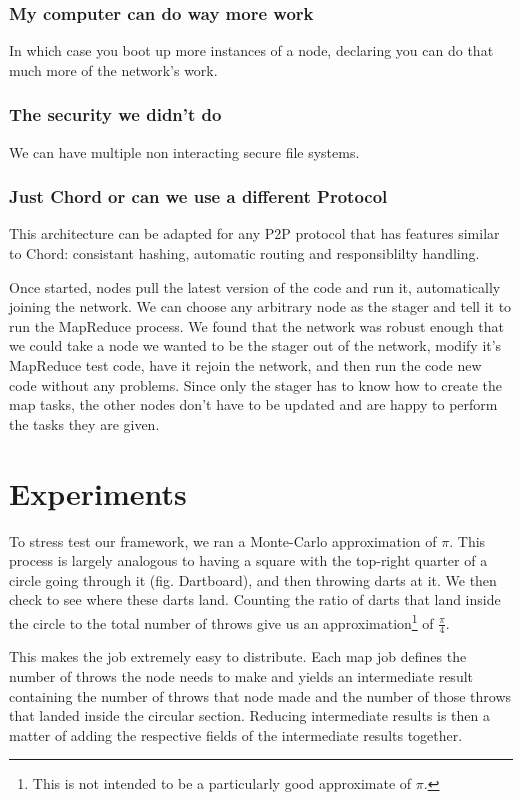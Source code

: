 \documentclass[conference, compsocconf, letterpaper]{IEEEtran}
\begin{document}
\subsubsection{My computer can do way more work}  In which case you boot up more instances of a node, declaring you can do that much more of the network's work.


\subsubsection{The security we didn't do}
We can have multiple non interacting secure file systems.

\subsubsection{Just Chord or can we use a different Protocol}
This architecture can be adapted for any P2P protocol that has features similar to Chord: consistant hashing, automatic routing and responsiblilty handling.



Once started, nodes pull the latest version of the code and run it, automatically joining the network.  We can choose any arbitrary node as the stager and tell it to run the MapReduce process. We found that the network was robust enough that we could take a node we wanted to be the stager out of the network, modify it's MapReduce test code, have it rejoin the network, and then run the code new code without any problems. Since only the stager has to know how to create the map tasks, the other nodes don't have to be updated and are happy to perform the tasks they are given.


\section{Experiments}
To stress test our framework, we ran a Monte-Carlo approximation of $\pi$. This process is largely analogous to having a square with the top-right quarter of a circle going through it (fig. Dartboard), and then throwing darts at it.  We then check to see where these darts land.  Counting the ratio of darts that land inside the circle to the total number of throws give us an approximation\footnote{This is not intended to be a particularly good approximate of $\pi$.} of $\frac{\pi}{4}$.

This makes the job extremely easy to distribute.  Each map job defines the number of throws the node needs to make and yields an intermediate result containing the number of throws that node made and the number of those throws that landed inside the circular section.  Reducing intermediate results is then a matter of adding the respective fields of the intermediate results together. 
\end{document}
